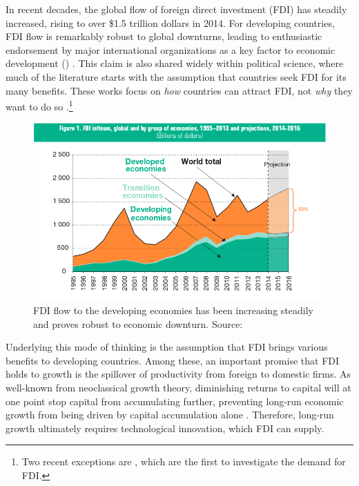 In recent decades, the global flow of foreign direct investment (FDI) has steadily increased, rising to over \$1.5 trillion dollars in 2014. For developing countries, FDI flow is remarkably robust to global downturns, leading to enthusiastic endorsement by major international organizations as a key factor to economic development () \citep{Mallampally1999, WorldEconomicForum2013}. This claim is also shared widely within political science, where much of the literature starts with the assumption that countries seek FDI for its many benefits. These works focus on \textit{how} countries can attract FDI, not \textit{why} they want to do so \citep{Jensen2003, Li2003, Li2006, Ahlquist2006}.\footnote{Two recent exceptions are \citet{Pinto2013, Pandya2013}, which are the first to investigate the demand for FDI.} 

\begin{figure}[!ht]
\includegraphics[width=\textwidth, height=\textheight,keepaspectratio]{../figure/global_fdi}
\caption{FDI flow to the developing economies has been increasing steadily and proves robust to economic downturn. Source: \citet[xiii]{UNCTAD2014}}
\label{fig:globalfdi}
\end{figure}

Underlying this mode of thinking is the assumption that FDI brings various benefits to developing countries. Among these, an important promise that FDI holds to growth is the spillover of productivity from foreign to domestic firms. As well-known from neoclassical growth theory, diminishing returns to capital will at one point stop capital from accumulating further, preventing long-run economic growth from being driven by capital accumulation alone \citep{Solow1956}. Therefore, long-run growth ultimately requires technological innovation, which FDI can supply.

